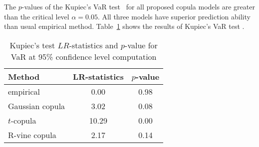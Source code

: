 The $p$-values of the Kupiec's VaR test~\cite{Kupiec95} for all proposed copula models are greater than the critical level $\alpha = 0.05$. 
All three models have superior prediction ability than usual empirical method.  
Table~\ref{tab:eng:Kupiec} shows the results of Kupiec's VaR test \cite{Kupiec95}.

\begin{table}[hbt!]
    \centering
    \caption{Kupiec's test $LR$-statistics and $p$-value for VaR at 95\% confidence level computation}
    \label{tab:eng:Kupiec}
    \setlength{\tabcolsep}{10pt}
    \begin{tabular}{lcc} \toprule
        Method & LR-statistics & $p$-value \\ \midrule
        empirical & 0.00 & 0.98 \\
        Gaussian copula & 3.02 & 0.08 \\
        $t$-copula & 10.29 & 0.00 \\
        R-vine copula & 2.17 & 0.14 \\ \bottomrule
    \end{tabular}
\end{table}



